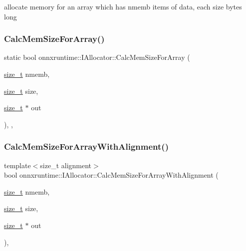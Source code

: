 allocate memory for an array which has nmemb items of data, each size bytes long \mbox{\label{classonnxruntime_1_1IAllocator_aea7bc9eca606c112261e38f32fe55fbe}} 
\subsubsection{\texorpdfstring{Calc\+Mem\+Size\+For\+Array()}{CalcMemSizeForArray()}}
{\footnotesize\ttfamily static bool onnxruntime\+::\+I\+Allocator\+::\+Calc\+Mem\+Size\+For\+Array (\begin{DoxyParamCaption}\item[{\mbox{\hyperlink{mlasi_8h_a503efbc1c6e50825320ad909366b78ab}{size\+\_\+t}}}]{nmemb,  }\item[{\mbox{\hyperlink{mlasi_8h_a503efbc1c6e50825320ad909366b78ab}{size\+\_\+t}}}]{size,  }\item[{\mbox{\hyperlink{mlasi_8h_a503efbc1c6e50825320ad909366b78ab}{size\+\_\+t}} $\ast$}]{out }\end{DoxyParamCaption})\hspace{0.3cm}{\ttfamily [inline]}, {\ttfamily [static]}, {\ttfamily [noexcept]}}

\mbox{\label{classonnxruntime_1_1IAllocator_ae5059c340e3b8703dd8cea8bb52859d0}} 
\subsubsection{\texorpdfstring{Calc\+Mem\+Size\+For\+Array\+With\+Alignment()}{CalcMemSizeForArrayWithAlignment()}}
{\footnotesize\ttfamily template$<$size\+\_\+t alignment$>$ \\
bool onnxruntime\+::\+I\+Allocator\+::\+Calc\+Mem\+Size\+For\+Array\+With\+Alignment (\begin{DoxyParamCaption}\item[{\mbox{\hyperlink{mlasi_8h_a503efbc1c6e50825320ad909366b78ab}{size\+\_\+t}}}]{nmemb,  }\item[{\mbox{\hyperlink{mlasi_8h_a503efbc1c6e50825320ad909366b78ab}{size\+\_\+t}}}]{size,  }\item[{\mbox{\hyperlink{mlasi_8h_a503efbc1c6e50825320ad909366b78ab}{size\+\_\+t}} $\ast$}]{out }\end{DoxyParamCaption})\hspace{0.3cm}{\ttfamily [static]}, {\ttfamily [noexcept]}}

